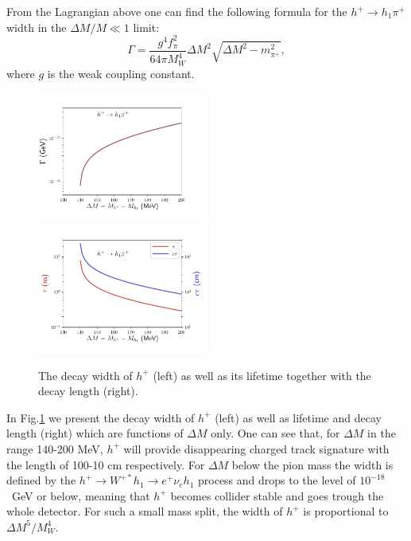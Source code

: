 \documentclass[12pt,a4paper]{article}
\begin{document}
{From the  Lagrangian above one can find 
the following formula
for the $h^+ \to  h_1 \pi^+$ width in the $\Delta M/M\ll 1$
limit:
\begin{equation}
\Gamma=\frac{g^4 f_{\pi}^2}{64 \pi M_W^4}
\Delta M^2\sqrt{\Delta M^2-m_{\pi^+}^2},
\end{equation}
where $g$ is the weak coupling constant.
\begin{figure}[htb]
  \includegraphics[width=0.5\textwidth]{gamma.pdf}%
  \includegraphics[width=0.5\textwidth]{lifetime.pdf}%
  \caption{ The decay width of $h^+$ (left) as well as its lifetime together with the decay length (right).
  }
  \label{fig:gamma}
\end{figure}
In Fig.\ref{fig:gamma} we present the decay width  of $h^+$ (left) as well as lifetime and decay length (right)
which are functions of $\Delta M$ only. One can see that, for $\Delta M$ in the range 140-200 MeV,
$h^+$ will provide disappearing charged track signature with the length of 100-10 cm respectively.
For $\Delta M$ below the pion mass the width is defined by the $h^+\to W^{+*}h_1 \to e^+\nu_e h_1$
process and drops to the level of $10^{-18}$~GeV or below,
meaning that $h^+$ becomes collider stable
and goes trough the whole detector. For such a small mass split, the width of  $h^+$ is proportional to  $\Delta M^5/M_W^4$.

}
\end{document}
